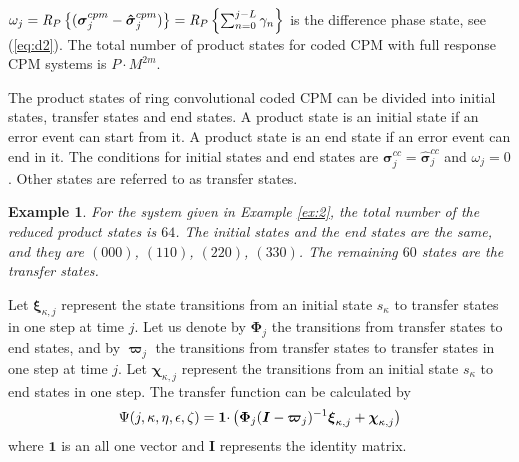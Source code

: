 \documentclass[12pt,twoside,onecolumn,a4paper,english]{IEEEtran2e}
\newtheorem{example}{Example}[section]
\begin{document}
$\omega_j=\emph{R}_P\left\{(\mathbf{\boldsymbol{\sigma}}_j^{cpm}-\mathbf{\boldsymbol{\hat\sigma}}_j^{cpm})\right\}=\emph{R}_P\left\{\sum_{n=0}^{j-L}\gamma_n\right\}$
is the difference phase state, see (\ref{eq:d2}). %
The total number of product states for coded CPM with full
response CPM systems is $P{\cdot}M^{2m}$.


The product states of ring convolutional coded CPM can be divided
into initial states, transfer states and end states. A product
state is an initial state if an error event can start from it. A
product state is an end state if an error event can end in it. The
conditions for initial states and end states are
$\mathbf{\boldsymbol{\sigma}}_j^{cc}=\mathbf{\boldsymbol{\hat\sigma}}_j^{cc}$
and $\omega_j=0$. Other states are referred to as transfer states.

\begin{example}\label{ex:3}
For the system given in Example \ref{ex:2}, %
the total number
of the reduced product states is $64$. The initial states and the end states are the same, and they are
$(000)$, $(110)$, $(220)$, $(330)$. The remaining $60$ states are the transfer states. %
\end{example}

Let ${\mathbf{\boldsymbol{\xi}}}_{\kappa,j}$ represent the state
transitions from an initial state $s_\kappa$ to transfer states in
one step at time $j$. Let us denote by ${\mathbf{\boldsymbol{\Phi}}}_j$ the transitions
from transfer states to end states, and by
${\mathbf{\boldsymbol{\varpi}}}_j$ the transitions from transfer states to
transfer states in one step at time $j$. Let
${\mathbf{\boldsymbol{\chi}}}_{\kappa,j}$ represent the transitions
from an initial state $s_\kappa$ to end states in one step. The
transfer function can be calculated by
\cite{SER-bound,codedcpm}\vspace{-1ex}
\begin{equation}\vspace{-1ex}\label{eq:generatingfunction}
\Psi(j,\kappa,\eta,\epsilon,\zeta)=\mathbf{\boldsymbol{1}}{\cdot}\left({\mathbf{\boldsymbol{\Phi}}}_j({\mathbf{\boldsymbol{I}}}-{\mathbf{\boldsymbol{\varpi}}}_j)^{-1}{\mathbf{\boldsymbol{\xi}}}_{\kappa,j}+{\mathbf{\boldsymbol{\chi}}}_{\kappa,j}\right)
\end{equation}
where $\mathbf{\boldsymbol{1}}$ is an all one vector and
$\mathbf{\boldsymbol{I}}$ represents the identity matrix.
\end{document}
